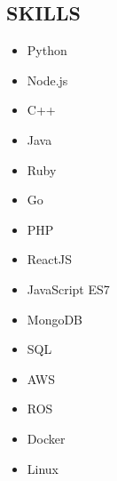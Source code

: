 \documentclass[]{res}
\begin{document}
\address{
Bachelor of Software Engineering (BSE), University of Waterloo 2018 \\
(415) 980-9210 \textbar ~paul.ashbourne@gmail.com \\
\url{www.github.com/paulashbourne} %
}
\address{855 Brannan St. APT 474 \\ \hfill San Francisco, CA \\ \hfill USA 94103}
\begin{resume}

\section{SKILLS}
\setlength\multicolsep{0pt}
\begin{multicols}{5}
  \begin{itemize}
    \item Python
    \item Node.js
    \item C++
    \item Java
    \item Ruby
    \item Go
    \item PHP
    \item ReactJS
    \item JavaScript ES7
    \item MongoDB
    \item SQL
    \item AWS
    \item ROS
    \item Docker
    \item Linux
  \end{itemize}
\end{multicols}


\end{resume}
\end{document}
